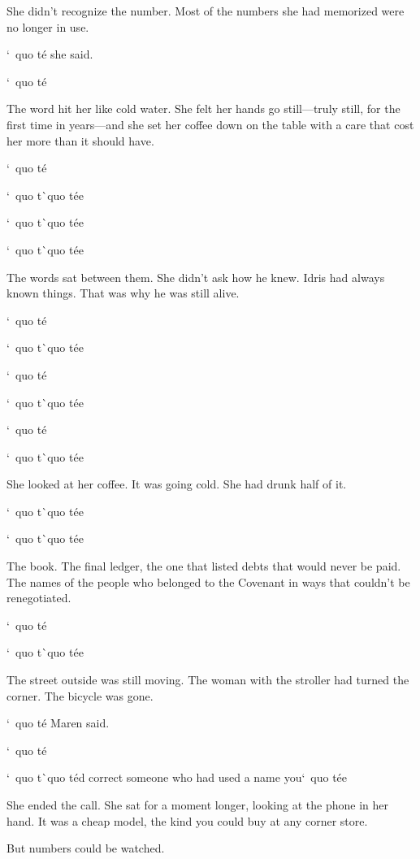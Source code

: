 \documentclass[12pt,letterpaper,openany]{book}
\begin{document}
\par
She didn't recognize the number. Most of the numbers she had memorized were no longer in use.
\par
`\ quo t\'e{} she said.
\par
`\ quo t\'e{}
\par
The word hit her like cold water. She felt her hands go still—truly still, for the first time in years—and she set her coffee down on the table with a care that cost her more than it should have.
\par
`\ quo t\'e{}
\par
`\ quo t\`\ quo t\'e{}e{}
\par
`\ quo t\`\ quo t\'e{}e{}
\par
`\ quo t\`\ quo t\'e{}e{}
\par
The words sat between them. She didn't ask how he knew. Idris had always known things. That was why he was still alive.
\par
`\ quo t\'e{}
\par
`\ quo t\`\ quo t\'e{}e{}
\par
`\ quo t\'e{}
\par
`\ quo t\`\ quo t\'e{}e{}
\par
`\ quo t\'e{}
\par
`\ quo t\`\ quo t\'e{}e{}
\par
She looked at her coffee. It was going cold. She had drunk half of it.
\par
`\ quo t\`\ quo t\'e{}e{}
\par
`\ quo t\`\ quo t\'e{}e{}
\par
The book. The final ledger, the one that listed debts that would never be paid. The names of the people who belonged to the Covenant in ways that couldn't be renegotiated.
\par
`\ quo t\'e{}
\par
`\ quo t\`\ quo t\'e{}e{}
\par
The street outside was still moving. The woman with the stroller had turned the corner. The bicycle was gone.
\par
`\ quo t\'e{} Maren said.
\par
`\ quo t\'e{}
\par
`\ quo t\`\ quo t\'e{}d correct someone who had used a name you`\ quo t\'e{}e{}
\par
She ended the call. She sat for a moment longer, looking at the phone in her hand. It was a cheap model, the kind you could buy at any corner store.
\par
But numbers could be watched.
\end{document}
